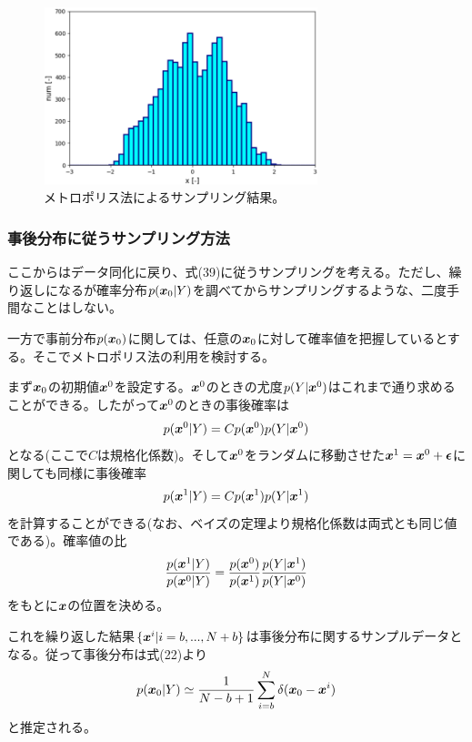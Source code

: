 \documentclass[dvipdfmx, 9pt, a4paper]{jsarticle}
\newcommand{\bm}[1]{{\mbox{\boldmath $#1$}}}
\begin{document}
\begin{figure}[b]
\begin{center}
\includegraphics[width=8cm]{"fig14.png"}
\caption{メトロポリス法によるサンプリング結果。}
\end{center}
\end{figure}

\subsubsection{事後分布に従うサンプリング方法}
ここからはデータ同化に戻り、式(39)に従うサンプリングを考える。ただし、繰り返しになるが確率分布$p(\bm x_0|Y)$を調べてからサンプリングするような、二度手間なことはしない。\par
一方で事前分布$p(\bm x_0)$に関しては、任意の$\bm x_0$に対して確率値を把握しているとする。そこでメトロポリス法の利用を検討する。\par
まず$\bm x_0$の初期値$\bm x^0$を設定する。$\bm x^0$のときの尤度$p(Y|\bm x^0)$はこれまで通り求めることができる。したがって$\bm x^0$のときの事後確率は
\begin{equation}
p(\bm x^0|Y)=Cp(\bm x^0)p(Y|\bm x^0) \notag
\end{equation}
となる(ここで$C$は規格化係数)。そして$\bm x^0$をランダムに移動させた$\bm x^1=\bm x^0+\bm \epsilon$に関しても同様に事後確率
\begin{equation}
p(\bm x^1|Y)=Cp(\bm x^1)p(Y|\bm x^1) \notag
\end{equation}
を計算することができる(なお、ベイズの定理より規格化係数は両式とも同じ値である)。確率値の比
\begin{equation}
\frac{p(\bm x^1|Y)}{p(\bm x^0|Y)}=\frac{p(\bm x^0)}{p(\bm x^1)}\frac{p(Y|\bm x^1)}{p(Y|\bm x^0)} \notag
\end{equation}
をもとに$\bm x$の位置を決める。

これを繰り返した結果$\{ \bm x^i | i=b, ..., N+b\}$は事後分布に関するサンプルデータとなる。従って事後分布は式(22)より
\begin{equation}
p(\bm x_0|Y) \simeq \frac{1}{N-b+1}\sum_{i=b}^N \delta(\bm x_0-\bm x^i) \notag
\end{equation}
と推定される。
\end{document}
